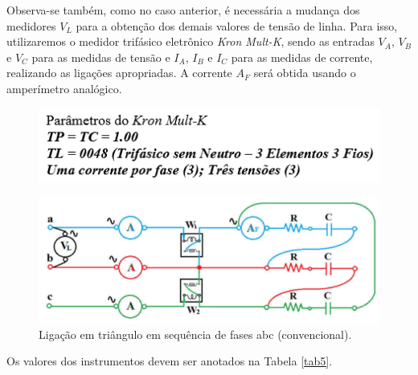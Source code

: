 \documentclass[a4paper,12pt,oneside,openany,table,xcdraw]{article}
\begin{document}
Observa-se também, como no caso anterior, é necessária a mudança dos
medidores $V_L$ para a obtenção dos demais valores de tensão de linha. Para isso,
utilizaremos o medidor trifásico eletrônico \emph{Kron Mult-K}, sendo as entradas $V_A$, $V_B$ e $V_C$
para as medidas de tensão e $I_A$, $I_B$ e $I_C$ para as medidas de corrente, realizando as
ligações apropriadas. A corrente $A_F$ será obtida usando o amperímetro analógico.
\begin{figure}[H]
\centering
\captionsetup{font=scriptsize}
\includegraphics[width=13.5cm]{parametros3}
\end{figure}
\begin{figure}[H]
\centering
\captionsetup{font=scriptsize}
\includegraphics[width=14cm]{fig2}
\caption{Ligação em triângulo em sequência de fases abc (convencional).}
\label{fig2}
\end{figure}

Os valores dos instrumentos devem ser anotados na Tabela \ref{tab5}.
\end{document}
